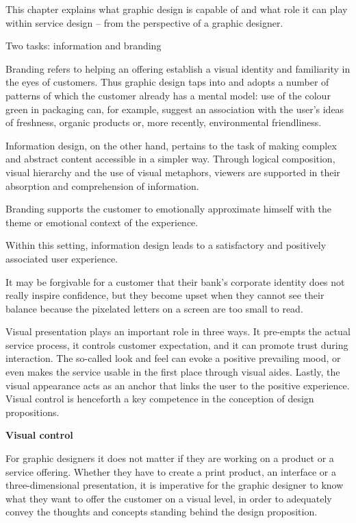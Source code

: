 This chapter explains what graphic design is capable of and what role it can play within service design – from the perspective of a graphic designer.

Two tasks: information and branding

Branding refers to helping an offering establish a visual identity and familiarity in the eyes of customers. Thus graphic design taps into and adopts a number of patterns of which the customer already has a mental model: use of the colour green in packaging can, for example, suggest an association with the user’s ideas of freshness, organic products or, more recently, environmental friendliness.

Information design, on the other hand, pertains to the task of making complex and abstract content accessible in a simpler way. Through logical composition, visual hierarchy and the use of visual metaphors, viewers are supported in their absorption and comprehension of information.

Branding supports the customer to emotionally approximate himself with the theme or emotional context of the experience.

Within this setting, information design leads to a satisfactory and positively associated user experience.

 It may be forgivable for a customer that their bank’s corporate identity does not really inspire confidence, but they become upset when they cannot see their balance because the pixelated letters on a screen are too small to read.

Visual presentation plays an important role in three ways. It pre-empts the actual service process, it controls customer expectation, and it can promote trust during interaction. The so-called look and feel can evoke a positive prevailing mood, or even makes the service usable in the first place through visual aides. Lastly, the visual appearance acts as an anchor that links the user to the positive experience. Visual control is henceforth a key competence in the conception of design propositions.

\textbf{Visual control}

For graphic designers it does not matter if they are working on a product or a service offering. Whether they have to create a print product, an interface or a three-dimensional presentation, it is imperative for the graphic designer to know what they want to offer the customer on a visual level, in order to adequately convey the thoughts and concepts standing behind the design proposition.

